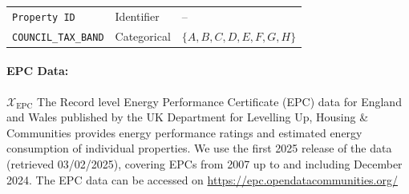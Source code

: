 \documentclass[12pt]{article}
\begin{document}
\begin{longtable}{@{} p{} p{} p{} @{}}
\texttt{Property ID} & Identifier & -- \\
\addlinespace
\texttt{COUNCIL\_TAX\_BAND} & Categorical & $\{A, B, C, D, E, F, G, H\}$ \\


\end{longtable}

\paragraph{EPC  Data:} $\mathcal{X}_{\text{EPC}}$ \quad The Record level Energy Performance Certificate (EPC) data for England and Wales published by the UK Department for Levelling Up, Housing \& Communities provides energy performance ratings and estimated energy consumption of individual properties. We use the first 2025 release of the data (retrieved 03/02/2025), covering EPCs from 2007 up to and including December 2024. The EPC data can be accessed on \url{https://epc.opendatacommunities.org/}
\end{document}

